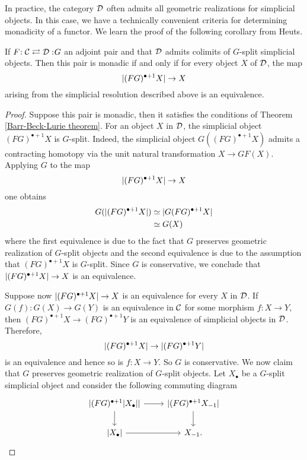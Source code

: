 In practice, the category ${\mathcal{D}}$ often admits all geometric realizations for simplicial objects. In this case, we have a technically convenient criteria for determining monadicity of a functor. We learn the proof of the following corollary from Heuts.
\begin{corollary}
\label{Cor of Barr-Beck-Lurie theorem}
If $F\negmedspace: {\mathcal{C}}\rightleftarrows {\mathcal{D}}:\negmedspace G$ an adjoint pair and that ${\mathcal{D}}$ admits colimits of $G$-split simplicial objects. Then this pair is monadic if and only if for every object $X$ of ${\mathcal{D}}$, the map
$$
\lvert(FG)^{\bullet+1}X\rvert \to X
$$
arising from the simplicial resolution described above is an equivalence.
\end{corollary}
\begin{proof}
	Suppose this pair is monadic, then it satisfies the conditions of Theorem \ref{Barr-Beck-Lurie theorem}. 
	For an object $X$ in ${\mathcal{D}}$, the simplicial object $(FG)^{\bullet+1}X$ is $G$-split. Indeed, the simplicial object $G((FG)^{\bullet+1}X)$ admits a contracting homotopy via the unit natural transformation $X \to GF(X)$.
	Applying $G$ to the map 
	$$
	\lvert(FG)^{\bullet+1}X\rvert \to X
	$$
	one obtains
	\begin{align*}
		G(\lvert(FG)^{\bullet+1}X\rvert) & \simeq \lvert G(FG)^{\bullet+1}X\rvert\\
		& \simeq G(X)
	\end{align*}
	where the first equivalence is due to the fact that $G$ preserves geometric realization of $G$-split objects and the second equivalence is due to the assumption that $(FG)^{\bullet+1}X$ is $G$-split.  
	Since $G$ is conservative, we conclude that $\lvert(FG)^{\bullet+1}X\rvert \to X$ is an equivalence.
	
	Suppose now $\lvert(FG)^{\bullet+1}X\rvert \to X$ is an equivalence for every $X$ in ${\mathcal{D}}$. If $G(f): G(X) \to G(Y)$ is an equivalence in ${\mathcal{C}}$ for some morphism $f:X \to Y$, then $(FG)^{\bullet+1} X \to (FG)^{\bullet+1}Y$ is an equivalence of simplicial objects in ${\mathcal{D}}$. Therefore, 
	$$
	\lvert(FG)^{\bullet+1} X\rvert \to \lvert(FG)^{\bullet+1} Y\rvert
	$$
	is an equivalence and hence so is $f: X\to Y$. So $G$ is conservative.
	We now claim that $G$ preserves geometric realization of $G$-split objects.
	Let $X_{\bullet}$ be a $G$-split simplicial object and consider the following commuting diagram
	\[
	\begin{tikzcd}
		\abs{(FG)^{\bullet+1} \abs{X_{\bullet}}} \ar[r] \ar[d]& \abs{(FG)^{\bullet+1} X_{-1} \ar[d]}     \\
		\abs{X_{\bullet}} \ar[r] & X_{-1}  .
	\end{tikzcd}
	\]
	

\end{proof}
